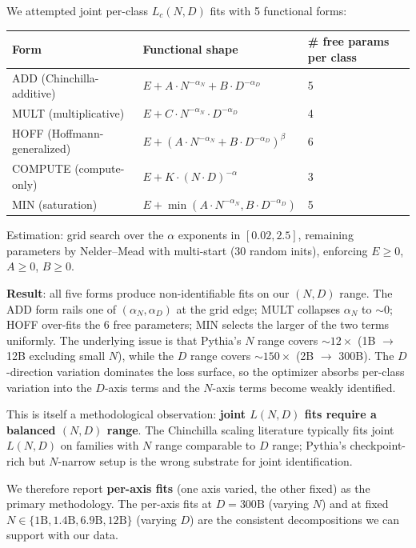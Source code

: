 \documentclass[10pt]{article}
\begin{document}
We attempted joint per-class $L_c(N, D)$ fits with 5 functional
forms:
\begin{center}
\small
\begin{tabular}{lll}
\toprule
Form & Functional shape & \# free params per class \\
\midrule
ADD (Chinchilla-additive)    & $E + A \cdot N^{-\alpha_N} + B \cdot D^{-\alpha_D}$ & 5 \\
MULT (multiplicative)        & $E + C \cdot N^{-\alpha_N} \cdot D^{-\alpha_D}$     & 4 \\
HOFF (Hoffmann-generalized)  & $E + (A \cdot N^{-\alpha_N} + B \cdot D^{-\alpha_D})^\beta$ & 6 \\
COMPUTE (compute-only)       & $E + K \cdot (N \cdot D)^{-\alpha}$                  & 3 \\
MIN (saturation)             & $E + \min(A \cdot N^{-\alpha_N}, B \cdot D^{-\alpha_D})$ & 5 \\
\bottomrule
\end{tabular}
\end{center}

Estimation: grid search over the $\alpha$ exponents in $[0.02, 2.5]$,
remaining parameters by Nelder--Mead with multi-start (30 random
inits), enforcing $E \geq 0$, $A \geq 0$, $B \geq 0$.

\textbf{Result}: all five forms produce non-identifiable fits on our
$(N, D)$ range. The ADD form rails one of $(\alpha_N, \alpha_D)$ at
the grid edge; MULT collapses $\alpha_N$ to $\sim 0$; HOFF over-fits
the 6 free parameters; MIN selects the larger of the two terms
uniformly. The underlying issue is that Pythia's $N$ range covers
$\sim 12\times$ (1B $\to$ 12B excluding small $N$), while the $D$
range covers $\sim 150\times$ (2B $\to$ 300B). The $D$-direction
variation dominates the loss surface, so the optimizer absorbs
per-class variation into the $D$-axis terms and the $N$-axis terms
become weakly identified.

This is itself a methodological observation: \textbf{joint $L(N, D)$
fits require a balanced $(N, D)$ range}. The Chinchilla scaling
literature typically fits joint $L(N, D)$ on families with $N$ range
comparable to $D$ range; Pythia's checkpoint-rich but $N$-narrow
setup is the wrong substrate for joint identification.

We therefore report \textbf{per-axis fits} (one axis varied, the
other fixed) as the primary methodology. The per-axis fits at
$D{=}300\text{B}$ (varying $N$) and at fixed $N \in \{1\text{B},
1.4\text{B}, 6.9\text{B}, 12\text{B}\}$ (varying $D$) are the
consistent decompositions we can support with our data.
\end{document}

